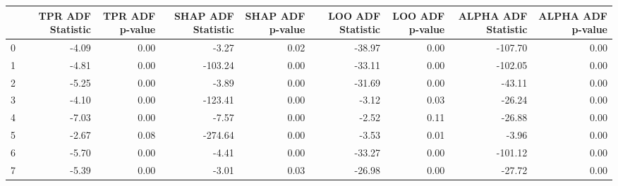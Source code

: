 \begin{tabular}{lrrrrrrrr}
\toprule
 & TPR ADF Statistic & TPR ADF p-value & SHAP ADF Statistic & SHAP ADF p-value & LOO ADF Statistic & LOO ADF p-value & ALPHA ADF Statistic & ALPHA ADF p-value \\
\midrule
0 & -4.09 & 0.00 & -3.27 & 0.02 & -38.97 & 0.00 & -107.70 & 0.00 \\
1 & -4.81 & 0.00 & -103.24 & 0.00 & -33.11 & 0.00 & -102.05 & 0.00 \\
2 & -5.25 & 0.00 & -3.89 & 0.00 & -31.69 & 0.00 & -43.11 & 0.00 \\
3 & -4.10 & 0.00 & -123.41 & 0.00 & -3.12 & 0.03 & -26.24 & 0.00 \\
4 & -7.03 & 0.00 & -7.57 & 0.00 & -2.52 & 0.11 & -26.88 & 0.00 \\
5 & -2.67 & 0.08 & -274.64 & 0.00 & -3.53 & 0.01 & -3.96 & 0.00 \\
6 & -5.70 & 0.00 & -4.41 & 0.00 & -33.27 & 0.00 & -101.12 & 0.00 \\
7 & -5.39 & 0.00 & -3.01 & 0.03 & -26.98 & 0.00 & -27.72 & 0.00 \\
\bottomrule
\end{tabular}
